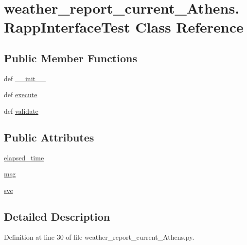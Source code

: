 \hypertarget{classweather__report__current__Athens_1_1RappInterfaceTest}{\section{weather\-\_\-report\-\_\-current\-\_\-\-Athens.\-Rapp\-Interface\-Test Class Reference}
\label{classweather__report__current__Athens_1_1RappInterfaceTest}
}
\subsection*{Public Member Functions}
\begin{DoxyCompactItemize}
\item 
def \hyperlink{classweather__report__current__Athens_1_1RappInterfaceTest_abe9c50edb75add48c886379d320d1ce3}{\-\_\-\-\_\-init\-\_\-\-\_\-}
\item 
def \hyperlink{classweather__report__current__Athens_1_1RappInterfaceTest_aa4c62cec815fcaf712a38c0b82f3091c}{execute}
\item 
def \hyperlink{classweather__report__current__Athens_1_1RappInterfaceTest_a517ed189f954fffb377469f7274d01f0}{validate}
\end{DoxyCompactItemize}
\subsection*{Public Attributes}
\begin{DoxyCompactItemize}
\item 
\hyperlink{classweather__report__current__Athens_1_1RappInterfaceTest_ae120bf4991b1eab3907b7fb3eaf9cef6}{elapsed\-\_\-time}
\item 
\hyperlink{classweather__report__current__Athens_1_1RappInterfaceTest_ae08ebb20296ee87b61b151ed5dfc5a10}{msg}
\item 
\hyperlink{classweather__report__current__Athens_1_1RappInterfaceTest_a8f4106a17382df2b4912d5845c2e570a}{svc}
\end{DoxyCompactItemize}


\subsection{Detailed Description}


Definition at line 30 of file weather\-\_\-report\-\_\-current\-\_\-\-Athens.\-py.



